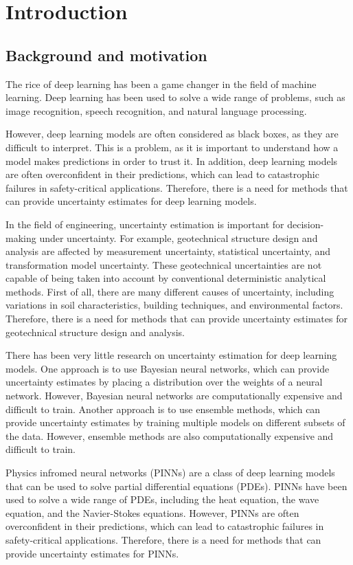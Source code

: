 \chapter{Introduction}



\section{Background and motivation}
The rice of deep learning has been a game changer in the field of machine learning. Deep learning has been used to solve a wide range of problems, such as image recognition, speech recognition, and natural language processing. 

However, deep learning models are often considered as black boxes, as they are difficult to interpret. This is a problem, as it is important to understand how a model makes predictions in order to trust it. In addition, deep learning models are often overconfident in their predictions, which can lead to catastrophic failures in safety-critical applications. Therefore, there is a need for methods that can provide uncertainty estimates for deep learning models.

In the field of engineering, uncertainty estimation is important for decision-making under uncertainty. For example, geotechnical structure design and analysis are affected by measurement uncertainty, statistical uncertainty, and transformation model uncertainty. These geotechnical uncertainties are not capable of being taken into account by conventional deterministic analytical methods. First of all, there are many different causes of uncertainty, including variations in soil characteristics, building techniques, and environmental factors. Therefore, there is a need for methods that can provide uncertainty estimates for geotechnical structure design and analysis.

There has been very little research on uncertainty estimation for deep learning models. One approach is to use Bayesian neural networks, which can provide uncertainty estimates by placing a distribution over the weights of a neural network. However, Bayesian neural networks are computationally expensive and difficult to train. Another approach is to use ensemble methods, which can provide uncertainty estimates by training multiple models on different subsets of the data. However, ensemble methods are also computationally expensive and difficult to train.

Physics infromed neural networks (PINNs) are a class of deep learning models that can be used to solve partial differential equations (PDEs). PINNs have been used to solve a wide range of PDEs, including the heat equation, the wave equation, and the Navier-Stokes equations. However, PINNs are often overconfident in their predictions, which can lead to catastrophic failures in safety-critical applications. Therefore, there is a need for methods that can provide uncertainty estimates for PINNs.

